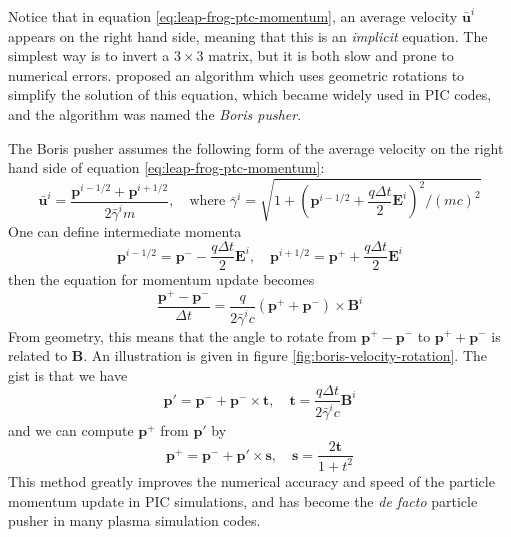 Notice that in equation \eqref{eq:leap-frog-ptc-momentum}, an average velocity
$\mathbf{\bar{u}}^{i}$ appears on the right hand side, meaning that this
is an {\it implicit} equation. The simplest way is to invert a $3\times 3$
matrix, but it is both slow and prone to numerical errors.
\citet{boris_relativistic_1970} proposed an algorithm which uses geometric
rotations to simplify the solution of this equation, which became widely used in
PIC codes, and the algorithm was named the {\it Boris pusher}.

The Boris pusher assumes the following form of the average velocity on the right
hand side of equation \eqref{eq:leap-frog-ptc-momentum}:
\begin{equation}
  \label{eq:boris-average-u}
  \mathbf{\bar{u}}^{i} = \frac{\mathbf{p}^{i-1/2} + \mathbf{p}^{i+1/2}}{2\bar{\gamma}^im},\quad \text{where } \bar{\gamma}^i = \sqrt{1 + \left( \mathbf{p}^{i-1/2} + \frac{q\Delta t}{2}\mathbf{E}^i \right)^2/(mc)^2}
\end{equation}
One can define intermediate momenta
\begin{equation}
  \label{eq:boris-intermediate-momenta}
  \mathbf{p}^{i-1/2} = \mathbf{p}^{-} - \frac{q\Delta t}{2}\mathbf{E}^{i},\quad \mathbf{p}^{i+1/2} = \mathbf{p}^{+} + \frac{q\Delta t}{2}\mathbf{E}^i
\end{equation}
then the equation for momentum update becomes
\begin{equation}
  \label{eq:boris-momentum-update}
  \frac{\mathbf{p}^+-\mathbf{p}^{-}}{\Delta t} = \frac{q}{2 \bar{\gamma}^ic}(\mathbf{p}^+ + \mathbf{p}^{-})\times \mathbf{B}^{i}
\end{equation}
From geometry, this means that the angle to rotate from
$\mathbf{p}^+-\mathbf{p}^{-}$ to $\mathbf{p}^++\mathbf{p}^{-}$ is related to
$\mathbf{B}$. An illustration is given in figure
\ref{fig:boris-velocity-rotation}. The gist is that we have
\begin{equation}
  \mathbf{p}' = \mathbf{p}^{-} + \mathbf{p}^{-}\times \mathbf{t},\quad \mathbf{t} = \frac{q\Delta t}{2\bar{\gamma}^ic}\mathbf{B}^{i}
\end{equation}
and we can compute $\mathbf{p}^{+}$ from $\mathbf{p}'$ by
\begin{equation}
  \mathbf{p}^+ = \mathbf{p}^{-} + \mathbf{p}'\times \mathbf{s},\quad \mathbf{s} = \frac{2\mathbf{t}}{1 + t^2}
\end{equation}
This method greatly improves the numerical accuracy and speed of the particle
momentum update in PIC simulations, and has become the {\it de facto} particle
pusher in many plasma simulation codes.

